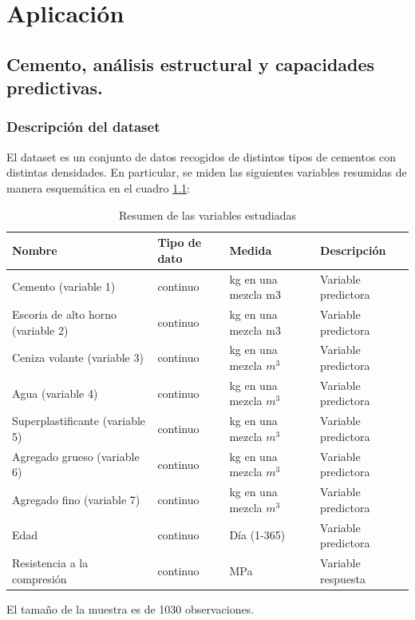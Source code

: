 \chapter{Aplicación}

\section{Cemento, análisis estructural y capacidades predictivas.}
\subsection*{Descripción del dataset}
\noindent El dataset  \cite{Yeh 2007} es un conjunto de datos recogidos de distintos tipos de cementos con distintas densidades. En particular, se miden las siguientes variables resumidas de manera esquemática en el cuadro \ref{tab:Resumen Variables}:
\begin{table}[h]
\footnotesize
\centering
\begin{tabular}{|l|l|l|l|}
\hline
Nombre & Tipo de dato & Medida & Descripción \\
\hline
Cemento (variable 1) & continuo & kg en una mezcla m3 & Variable predictora \\
Escoria de alto horno (variable 2) & continuo & kg en una mezcla m3 & Variable predictora \\
Ceniza volante (variable 3) & continuo & kg en una mezcla $m^3$ & Variable predictora \\
Agua (variable 4) & continuo & kg en una mezcla $m^3$ & Variable predictora \\
Superplastificante (variable 5) & continuo & kg en una mezcla $m^3$ & Variable predictora \\
Agregado grueso (variable 6) & continuo & kg en una mezcla $m^3$ & Variable predictora \\
Agregado fino (variable 7) & continuo & kg en una mezcla $m^3$ & Variable predictora \\
Edad & continuo & Día (1-365) & Variable predictora \\
Resistencia a la compresión & continuo & MPa & Variable respuesta \\
\hline
\end{tabular}
\caption{Resumen de las variables estudiadas}
\label{tab:Resumen Variables}
\end{table}




\noindent El tamaño de la muestra es de 1030 observaciones. 


